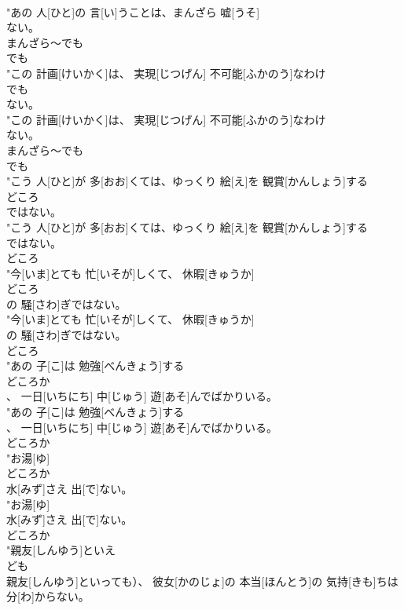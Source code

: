 \documentclass[8pt]{extreport}
\begin{document}
\begin{CJK}{UTF8}{min}
\\	"あの 人[ひと]の 言[い]うことは、まんざら 嘘[うそ]
\\	ない。
\\	まんざら～でも 
\\	でも
\\	"この 計画[けいかく]は、 実現[じつげん] 不可能[ふかのう]なわけ
\\	でも
\\	ない。
\\	"この 計画[けいかく]は、 実現[じつげん] 不可能[ふかのう]なわけ
\\	ない。
\\	まんざら～でも 
\\	でも
\\	"こう 人[ひと]が 多[おお]くては、ゆっくり 絵[え]を 観賞[かんしょう]する
\\	どころ
\\	ではない。
\\	"こう 人[ひと]が 多[おお]くては、ゆっくり 絵[え]を 観賞[かんしょう]する
\\	ではない。
\\	どころ
\\	"今[いま]とても 忙[いそが]しくて、 休暇[きゅうか]
\\	どころ
\\	の 騒[さわ]ぎではない。
\\	"今[いま]とても 忙[いそが]しくて、 休暇[きゅうか]
\\	の 騒[さわ]ぎではない。
\\	どころ
\\	"あの 子[こ]は 勉強[べんきょう]する
\\	どころか
\\	、 一日[いちにち] 中[じゅう] 遊[あそ]んでばかりいる。
\\	"あの 子[こ]は 勉強[べんきょう]する
\\	、 一日[いちにち] 中[じゅう] 遊[あそ]んでばかりいる。
\\	どころか
\\	"お湯[ゆ]
\\	どころか
\\	水[みず]さえ 出[で]ない。
\\	"お湯[ゆ]
\\	水[みず]さえ 出[で]ない。
\\	どころか
\\	"親友[しんゆう]といえ
\\	ども
\\	親友[しんゆう]といっても）、 彼女[かのじょ]の 本当[ほんとう]の 気持[きも]ちは 分[わ]からない。

\end{CJK}
\end{document}
